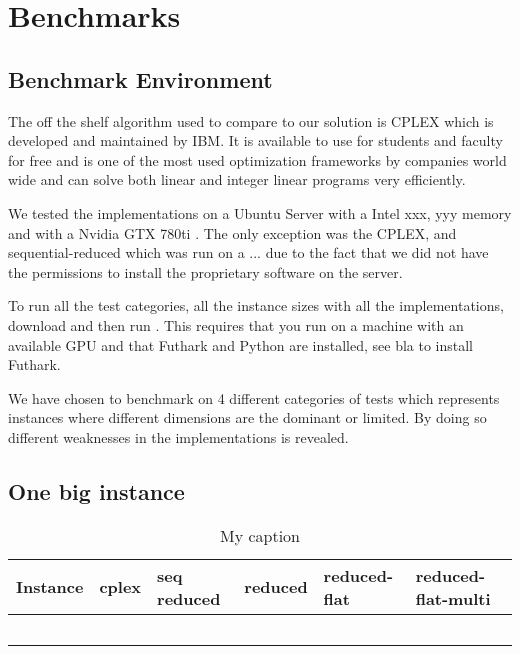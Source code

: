 \section{Benchmarks}
\subsection{Benchmark Environment}
The off the shelf algorithm used to compare to our solution is CPLEX which is developed and maintained by IBM. It is available to use for students and faculty for free and is one of the most used optimization frameworks by companies world wide and can solve both linear and integer linear programs very efficiently.

We tested the implementations on a Ubuntu  Server with a Intel xxx, yyy memory and with a Nvidia GTX 780ti . The only exception was the CPLEX, and sequential-reduced which was run on a ... due to the fact that we did not have the permissions to install the proprietary software on the server.

To run all the test categories, all the instance sizes with all the implementations, download  and then run . This requires that you run on a machine with an available GPU and that Futhark and Python are installed, see bla to install Futhark.

We have chosen to benchmark on 4 different categories of tests which represents instances where different dimensions are the dominant or limited. By doing so different weaknesses in the implementations is revealed. 

\subsection{One big instance}
\begin{table}[H]
	\centering
	\label{table:one-big-instance}
	\begin{tabular}{|l|l|l|l|l|l|}\hline
		Instance & cplex & seq reduced & reduced & reduced-flat & reduced-flat-multi \\\hline
		&       &             &         &              &                    \\\hline
		&       &             &         &              &                    \\\hline
		&       &             &         &              &                   \\\hline
		&       &             &         &              &                   \\\hline
		&       &             &         &              &                   \\\hline
	\end{tabular}
	\caption{My caption}
\end{table}

